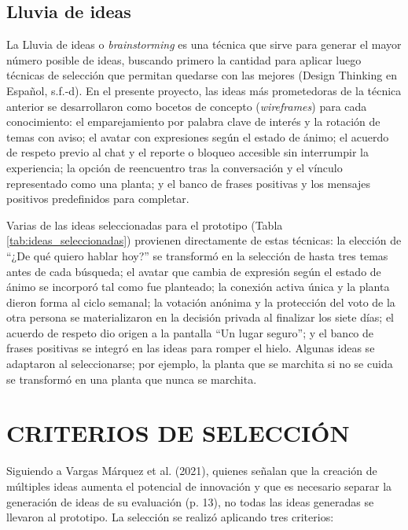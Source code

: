 \subsection{Lluvia de ideas}
La Lluvia de ideas o \textit{brainstorming} es una técnica que sirve para generar el mayor número posible de ideas, buscando primero la cantidad para aplicar luego técnicas de selección que permitan quedarse con las mejores (Design Thinking en Español, s.f.-d). En el presente proyecto, las ideas más prometedoras de la técnica anterior se desarrollaron como bocetos de concepto (\textit{wireframes}) para cada conocimiento: el emparejamiento por palabra clave de interés y la rotación de temas con aviso; el avatar con expresiones según el estado de ánimo; el acuerdo de respeto previo al chat y el reporte o bloqueo accesible sin interrumpir la experiencia; la opción de reencuentro tras la conversación y el vínculo representado como una planta; y el banco de frases positivas y los mensajes positivos predefinidos para completar.

Varias de las ideas seleccionadas para el prototipo (Tabla \ref{tab:ideas_seleccionadas}) provienen directamente de estas técnicas: la elección de ``¿De qué quiero hablar hoy?'' se transformó en la selección de hasta tres temas antes de cada búsqueda; el avatar que cambia de expresión según el estado de ánimo se incorporó tal como fue planteado; la conexión activa única y la planta dieron forma al ciclo semanal; la votación anónima y la protección del voto de la otra persona se materializaron en la decisión privada al finalizar los siete días; el acuerdo de respeto dio origen a la pantalla ``Un lugar seguro''; y el banco de frases positivas se integró en las ideas para romper el hielo. Algunas ideas se adaptaron al seleccionarse; por ejemplo, la planta que se marchita si no se cuida se transformó en una planta que nunca se marchita.

\section{CRITERIOS DE SELECCIÓN}
Siguiendo a Vargas Márquez et al. (2021), quienes señalan que la creación de múltiples ideas aumenta el potencial de innovación y que es necesario separar la generación de ideas de su evaluación (p. 13), no todas las ideas generadas se llevaron al prototipo. La selección se realizó aplicando tres criterios:

